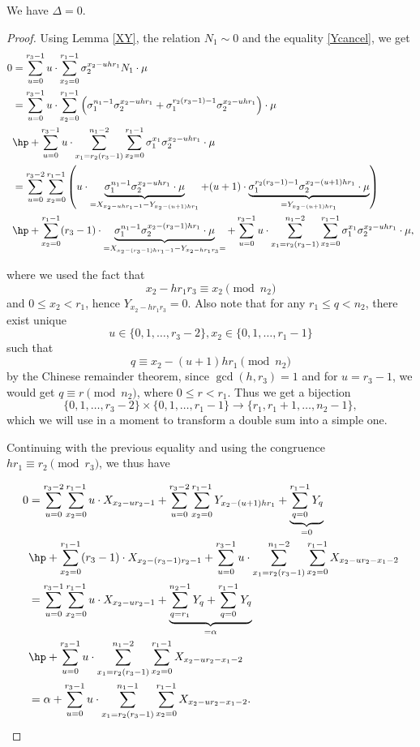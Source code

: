 \begin{lemma}\label{D0}
We have $\Delta=0$.
\end{lemma}
\begin{proof}
Using Lemma \ref{XY}, the relation $N_1\sim 0$ and the equality \eqref{Ycancel},
we get
\begin{align*}
0&= \sum_{u=0}^{r_3-1}u\cdot \sum _{x_2=0}^{r_1-1}\sigma_2^{x_2-uh r_1}N_1\cdot \mu\\
&=\sum_{u=0}^{r_3-1}u\cdot \sum _{x_2=0}^{r_1-1} \left( \sigma_1^{n_1-1}\sigma_2^{x_2-uh r_1}+\sigma_1^{r_2(r_3-1)-1}\sigma_2^{x_2-uh r_1}\right)\cdot \mu\\
&\hp+\sum_{u=0}^{r_3-1}u\cdot \sum_{x_1=r_2(r_3-1)}^{n_1-2}\sum _{x_2=0}^{r_1-1}\sigma_1^{x_1}\sigma_2^{x_2-uh r_1}\cdot \mu\\
&=\sum_{u=0}^{r_3-2} \sum _{x_2=0}^{r_1-1} \left( u\cdot\underbrace{\sigma_1^{n_1-1}\sigma_2^{x_2-uh r_1}\cdot \mu}_{=X_{x_2-uhr_1-1}-Y_{x_2-(u+1)hr_1}}+(u+1)\cdot\underbrace{\sigma_1^{r_2(r_3-1)-1}\sigma_2^{x_2-(u+1)h r_1}\cdot \mu}_{=Y_{x_2-(u+1)h r_1}}\right)\\
&\hp+\sum_{x_2=0}^{r_1-1}(r_3-1)\cdot \underbrace{\sigma_1^{n_1-1}\sigma_2^{x_2-(r_3-1)h r_1}\cdot \mu}_{=
X_{x_2-(r_3-1)hr_1-1}-Y_{x_2-hr_1r_3}=
}+\sum_{u=0}^{r_3-1}u\cdot \sum_{x_1=r_2(r_3-1)}^{n_1-2}\sum _{x_2=0}^{r_1-1}\sigma_1^{x_1}\sigma_2^{x_2-uh r_1}\cdot \mu,
\end{align*}

where we used the fact that $$x_2-hr_1r_3\equiv x_2\pmod{n_2}$$  and $0\leq x_2< r_1$, hence $Y_{x_2-hr_1r_3}=0$. Also note that for any $r_1\leq q<n_2$, there exist unique $$u\in\{0,1,\dots,r_3-2\},x_2\in\{0,1,\dots,r_1-1\}$$ such that $$q\equiv x_2-(u+1)hr_1 \pmod{n_2}$$ by the Chinese remainder theorem, since $\gcd(h,r_3)=1$ and for $u=r_3-1$, we would get  $q\equiv r\pmod{n_2}$, where $0\leq r<r_1$. Thus we get a bijection $$\{0,1,\dots,r_3-2\}\times\{0,1,\dots,r_1-1\}\to \{r_1,r_1+1,\dots,n_2-1\},$$ which we will use in a moment to transform a double sum into a simple one.

Continuing with the previous equality and using the congruence $hr_1\equiv r_2\pmod{r_3}$, we thus have

\begin{align*}
0&=\sum_{u=0}^{r_3-2} \sum _{x_2=0}^{r_1-1} u\cdot X_{x_2-ur_2-1}+\sum_{u=0}^{r_3-2} \sum _{x_2=0}^{r_1-1} Y_{x_2-(u+1)hr_1}+\underbrace{\sum_{q=0}^{r_1-1}Y_{q}}_{=0}\\
&\hp+\sum_{x_2=0}^{r_1-1}(r_3-1)\cdot X_{x_2-(r_3-1)r_2-1}+\sum_{u=0}^{r_3-1}u\cdot \sum_{x_1=r_2(r_3-1)}^{n_1-2}\sum _{x_2=0}^{r_1-1}X_{x_2-ur_2-x_1-2}\\
&=\sum_{u=0}^{r_3-1} \sum _{x_2=0}^{r_1-1} u\cdot X_{x_2-ur_2-1}+\underbrace{\sum_{q=r_1}^{n_2-1} Y_{q}+\sum_{q=0}^{r_1-1}Y_{q}}_{=\alpha}\\
&\hp+\sum_{u=0}^{r_3-1}u\cdot \sum_{x_1=r_2(r_3-1)}^{n_1-2}\sum _{x_2=0}^{r_1-1}X_{x_2-ur_2-x_1-2}\\
&=\alpha+\sum_{u=0}^{r_3-1}u\cdot \sum_{x_1=r_2(r_3-1)}^{n_1-1}\sum _{x_2=0}^{r_1-1}X_{x_2-ur_2-x_1-2}.
\end{align*}


\end{proof}
